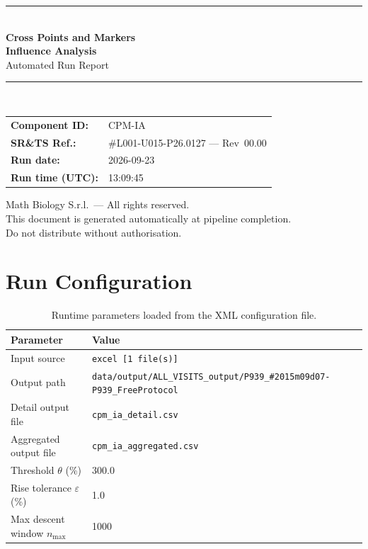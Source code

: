 \documentclass[a4paper,11pt]{article}
\begin{document}
\begin{titlepage}
\begin{center}
  \vspace*{1.8cm}
  {\color{dmaaccent}\rule{\linewidth}{1.5pt}}\\[0.6cm]
  {\LARGE\bfseries\color{dmaaccent}
    Cross Points and Markers\\[0.25cm]
    Influence Analysis}\\[0.4cm]
  {\Large Automated Run Report}\\[0.3cm]
  {\color{dmaaccent}\rule{\linewidth}{1.5pt}}\\[2cm]

  \begin{tabular}{ll}
    \textbf{Component ID:}   & CPM-IA \\[0.3cm]
    \textbf{SR\&TS Ref.:}    & \#L001-U015-P26.0127 --- Rev~00.00 \\[0.3cm]
    \textbf{Run date:}       & 2026-09-23 \\[0.3cm]
    \textbf{Run time (UTC):} & 13:09:45 \\
  \end{tabular}

  \vfill
  {\color{dmagray}\small
    Math Biology S.r.l.\ --- All rights reserved.\\
    This document is generated automatically at pipeline completion.\\
    Do not distribute without authorisation.}
\end{center}
\end{titlepage}

\tableofcontents
\clearpage

\section{Run Configuration}

\begin{table}[h!]
\centering
\small
\caption{Runtime parameters loaded from the XML configuration file.}
\begin{tabular}{ll}
\toprule
\textbf{Parameter} & \textbf{Value} \\
\midrule
Input source                      & \texttt{excel [1 file(s)]} \\
Output path                       & \texttt{data/output/ALL\_VISITS\_output/P939\_\#2015m09d07-P939\_FreeProtocol} \\
Detail output file                & \texttt{cpm\_ia\_detail.csv} \\
Aggregated output file            & \texttt{cpm\_ia\_aggregated.csv} \\
Threshold $\theta$ (\%)           & 300.0 \\
Rise tolerance $\varepsilon$ (\%) & 1.0 \\
Max descent window $n_{\max}$     & 1000 \\
\bottomrule
\end{tabular}
\end{table}
\end{document}
